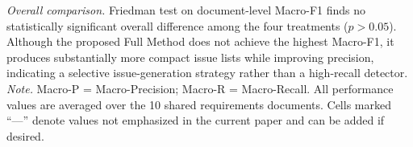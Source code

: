 \begin{table}[t]
\centering
\caption{Treatment-level performance results.}
\label{tab:treatment_results}
\renewcommand{\arraystretch}{1.15}

\vspace{0.4em}
\begin{minipage}{0.97\textwidth}
\footnotesize
\textit{Overall comparison.} Friedman test on document-level Macro-F1 finds no statistically significant overall difference among the four treatments ($p>0.05$). Although the proposed Full Method does not achieve the highest Macro-F1, it produces substantially more compact issue lists while improving precision, indicating a selective issue-generation strategy rather than a high-recall detector.
\textit{Note.} Macro-P = Macro-Precision; Macro-R = Macro-Recall. All performance values are averaged over the 10 shared requirements documents. Cells marked ``---'' denote values not emphasized in the current paper and can be added if desired.
\end{minipage}
\end{table}
